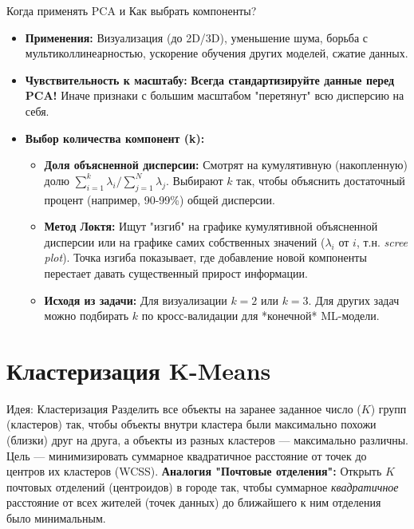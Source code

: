 \begin{alerttextbox}{Когда применять PCA и Как выбрать компоненты?}
    \begin{itemize}
        \item \textbf{Применения:} Визуализация (до 2D/3D), уменьшение шума, борьба с мультиколлинеарностью, ускорение обучения других моделей, сжатие данных.
        \item \textbf{Чувствительность к масштабу:} \textbf{Всегда стандартизируйте данные перед PCA!} Иначе признаки с большим масштабом "перетянут" всю дисперсию на себя.
        \item \textbf{Выбор количества компонент (k):}
            \begin{itemize}
                \item \textbf{Доля объясненной дисперсии:} Смотрят на кумулятивную (накопленную) долю $\sum_{i=1}^{k} \lambda_i / \sum_{j=1}^{N} \lambda_j$. Выбирают $k$ так, чтобы объяснить достаточный процент (например, 90-99\%) общей дисперсии.
                \item \textbf{Метод Локтя:} Ищут "изгиб" на графике кумулятивной объясненной дисперсии или на графике самих собственных значений ($\lambda_i$ от $i$, т.н. \textit{scree plot}). Точка изгиба показывает, где добавление новой компоненты перестает давать существенный прирост информации.
                \item \textbf{Исходя из задачи:} Для визуализации $k=2$ или $k=3$. Для других задач можно подбирать $k$ по кросс-валидации для *конечной* ML-модели.
            \end{itemize}
    \end{itemize}
\end{alerttextbox}

\section{Кластеризация K-Means}

\begin{myblock}{Идея: Кластеризация}
    Разделить все объекты на заранее заданное число ($K$) групп (кластеров) так, чтобы объекты внутри кластера были максимально похожи (близки) друг на друга, а объекты из разных кластеров — максимально различны. Цель — минимизировать суммарное квадратичное расстояние от точек до центров их кластеров (WCSS).
    \vspace{0.5ex}
    \textbf{Аналогия "Почтовые отделения":} Открыть $K$ почтовых отделений (центроидов) в городе так, чтобы суммарное \textit{квадратичное} расстояние от всех жителей (точек данных) до ближайшего к ним отделения было минимальным.
\end{myblock}

